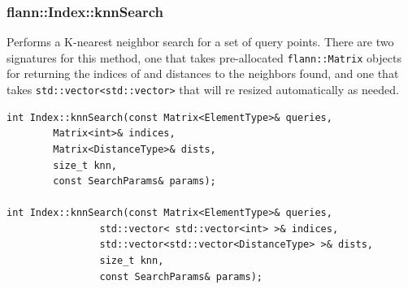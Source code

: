 \documentclass[letter,10pt]{article}
\begin{document}
\subsubsection{flann::Index::knnSearch}
Performs a K-nearest neighbor search for a set of query points. There are two signatures for this
method, one that takes pre-allocated \texttt{flann::Matrix} objects for returning the indices of and distances to the
neighbors found, and one that takes \texttt{std::vector<std::vector>} that will re resized automatically as needed.
\begin{Verbatim}[fontsize=\footnotesize,frame=single]
int Index::knnSearch(const Matrix<ElementType>& queries,
		Matrix<int>& indices, 
		Matrix<DistanceType>& dists,
		size_t knn,
		const SearchParams& params);

int Index::knnSearch(const Matrix<ElementType>& queries,
                std::vector< std::vector<int> >& indices,
                std::vector<std::vector<DistanceType> >& dists,
                size_t knn,
                const SearchParams& params);
\end{Verbatim}
\end{document}
